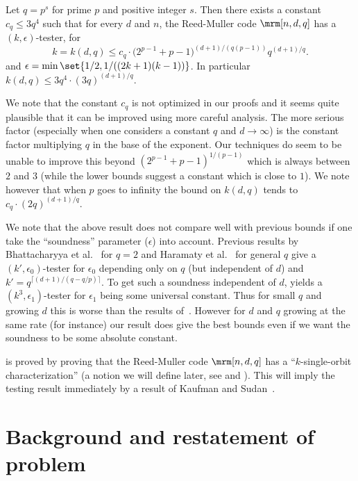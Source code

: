 \begin{theorem}[Main]\label{thm:main-imp}
Let $q = p^s$ for prime $p$ and positive integer $s$.
Then there exists a constant $c_q \leq 3q^4$ such that for every
$d$ and $n$,
the Reed-Muller code $\mrm[n,d,q]$
has a $(k,\epsilon)$-tester, for 
\[k = k(d,q) \leq c_q \cdot  \big(2^{p-1}+p-1\big)^{ (d+1)/(q(p-1))} q^{(d+1)/q}.\]
and $\epsilon = \min\set{1/2, {1}/{((2k+1)(k-1))}    }$.
In particular $k(d,q) \leq 3q^4 \cdot (3q)^{(d+1)/q}$.
\end{theorem}



We note that the constant $c_q$ is not optimized in our proofs and
it seems quite plausible that it can be improved using more careful
analysis. The more serious factor (especially when one considers a
constant $q$ and $d \to \infty$) is the constant factor multiplying $q$
in the base of the exponent. Our techniques do seem to be unable
to improve this beyond $(2^{p-1}+p-1)^{1/(p-1)}$ which is always
between $2$ and $3$ (while the lower bounds suggest a constant
which is close to $1$). We note however that when $p$ goes to infinity the
bound on $k(d,q)$ tends to $c_q \cdot (2q)^{(d+1)/q}$.

We note  that the above result does not compare well with previous
bounds if one take the ``soundness'' parameter ($\epsilon$) into account. 
Previous results by Bhattacharyya et al.~\cite{BKSSZ} for $q=2$
and Haramaty et al.~\cite{HSS11} for general $q$ give a 
$(k',\epsilon_0)$-tester for $\epsilon_0$ depending only
on $q$ (but independent of $d$)
and $k' = q^{\lceil {(d+1)}/{(q - q/p)} \rceil}$. To get such a
soundness independent of $d$,  yields
a $(k^3,\epsilon_1)$-tester for $\epsilon_1$ being some
universal constant. Thus for small $q$ and growing $d$ this is
worse than the results of~\cite{BKSSZ,HSS11}. However for $d$ and
$q$ growing at the same rate (for instance) our result does give
the best bounds even if we want the soundness to be some absolute
constant.

 is proved by proving that the
Reed-Muller code $\mrm[n,d,q]$ has a ``$k$-single-orbit characterization''
(a notion we will define later, see  and
). This will imply the testing result
immediately by a result of Kaufman and Sudan~\cite{KS08}.

\section{Background and restatement of problem}
\label{sec:restate}

